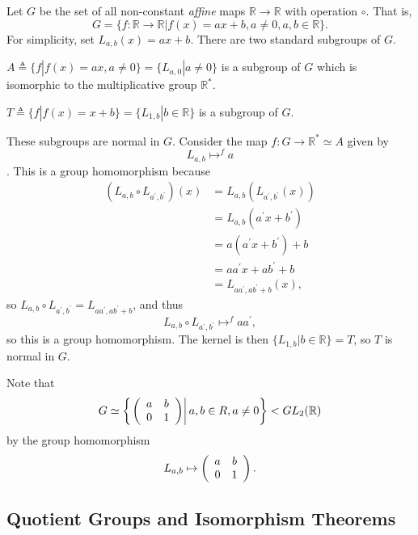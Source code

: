 \begin{xmpl}
Let $G$ be the set of all non-constant \emph{affine} maps
$\mathbb{R} \to \mathbb{R}$ with operation $\circ$. That is,
$$
G = \{ f : \mathbb{R} \to \mathbb{R} | f(x) = ax + b,
                                       a \neq 0,
                                       a, b \in \mathbb{R}
    \}.
$$
For simplicity, set $L_{a,b}(x) = ax + b$. There are two standard
subgroups of $G$.

$A \triangleq \{ f | f(x) = ax, a \neq 0 \} = \{L_{a, 0} | a \neq 0\}$
is a subgroup of $G$ which is isomorphic to the multiplicative group
$\mathbb{R}^\ast$.

$T \triangleq \{ f | f(x) = x + b \} = \{ L_{1,b} | b \in \mathbb{R}
\}$ is a subgroup of $G$.

These subgroups are normal in $G$. Consider the map
$f : G \to \mathbb{R}^\ast \simeq A$ given by
$$
L_{a,b} \mathrel{\mathop{\mapsto}^{f}} a
$$.
This is a group homomorphism because
\begin{align*}
(L_{a,b} \circ L_{a^\prime, b^\prime})(x)
 & = L_{a,b}(L_{a^\prime, b^\prime}(x)) \\
 & = L_{a,b}(a^\prime x + b^\prime) \\
 & = a(a^\prime x + b^\prime) + b \\
 & = aa^\prime x + ab^\prime + b \\
 & = L_{a a^\prime, a b^\prime + b}(x),
\end{align*}
so $L_{a,b} \circ L_{a^\prime, b^\prime} = L_{a a^\prime, a b^\prime +
  b}$, and thus
$$
L_{a,b} \circ L_{a^\prime, b^\prime} \mathrel{\mathop{\mapsto}^{f}} a a^\prime,
$$
so this is a group homomorphism. The kernel is then
$\{L_{1,b} | b \in \mathbb{R} \} = T$, so $T$ is normal in $G$.
\end{xmpl}

Note that
$$
G \simeq \left\{
\left.\left(\begin{array}{c c}
a & b \\ 0 & 1
\end{array}\right)\right| a, b \in R, a \neq 0
\right\} < GL_2(\mathbb{R})
$$
by the group homomorphism
$$
L_{a,b} \mapsto \left(\begin{array}{c c}
a & b \\ 0 & 1
\end{array}\right).
$$

\subsection{Quotient Groups and Isomorphism Theorems}

